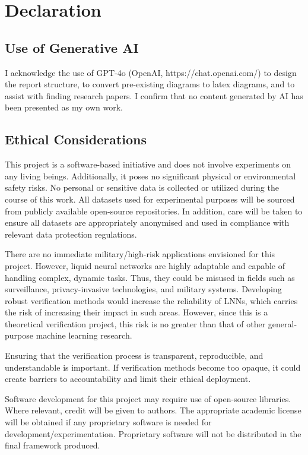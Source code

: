 \chapter*{Declaration}

\section*{Use of Generative AI}

I acknowledge the use of GPT-4o (OpenAI, https://chat.openai.com/) to design the report structure, to convert pre-existing diagrams to latex diagrams, and to assist with finding research papers. I confirm that no content generated by AI has been presented as my own work. 

\section*{Ethical Considerations}

This project is a software-based initiative and does not involve experiments on any living beings. Additionally, it poses no significant physical or environmental safety risks. No personal or sensitive data is collected or utilized during the course of this work. All datasets used for experimental purposes will be sourced from publicly available open-source repositories. In addition, care will be taken to ensure all datasets are appropriately anonymised and used in compliance with relevant data protection regulations.

There are no immediate military/high-risk applications envisioned for this project. However, liquid neural networks are highly adaptable and capable of handling complex, dynamic tasks. Thus, they could be misused in fields such as surveillance, privacy-invasive technologies, and military systems. Developing robust verification methods would increase the reliability of LNNs, which carries the risk of increasing their impact in such areas. However, since this is a theoretical verification project, this risk is no greater than that of other general-purpose machine learning research.

Ensuring that the verification process is transparent, reproducible, and understandable is important. If verification methods become too opaque, it could create barriers to accountability and limit their ethical deployment.

Software development for this project may require use of open-source libraries. Where relevant, credit will be given to authors. The appropriate academic license will be obtained if any proprietary software is needed for development/experimentation. Proprietary software will not be distributed in the final framework produced.

